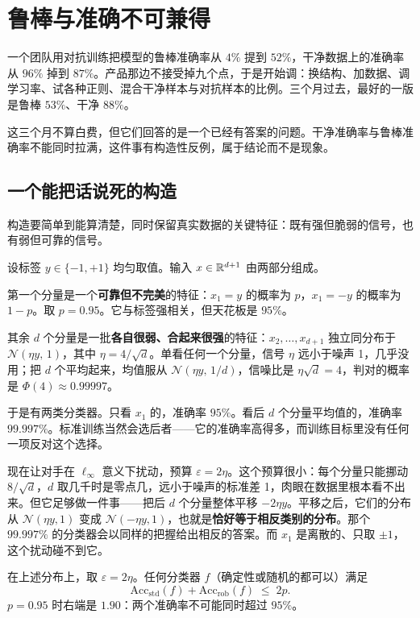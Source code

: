 \section{鲁棒与准确不可兼得}
\label{sec:17-Constrained-Guarantees/02-Adversarial-Robustness/03}

一个团队用对抗训练把模型的鲁棒准确率从 \(4\%\) 提到 \(52\%\)，干净数据上的准确率从 \(96\%\) 掉到 \(87\%\)。产品那边不接受掉九个点，于是开始调：换结构、加数据、调学习率、试各种正则、混合干净样本与对抗样本的比例。三个月过去，最好的一版是鲁棒 \(53\%\)、干净 \(88\%\)。

这三个月不算白费，但它们回答的是一个已经有答案的问题。干净准确率与鲁棒准确率不能同时拉满，这件事有构造性反例，属于结论而不是现象。

\subsection{一个能把话说死的构造}

构造要简单到能算清楚，同时保留真实数据的关键特征：既有强但脆弱的信号，也有弱但可靠的信号。

设标签 \(y\in\{-1,+1\}\) 均匀取值。输入 \(x\in\mathbb{R}^{d+1}\) 由两部分组成。

第一个分量是一个\textbf{可靠但不完美}的特征：\(x_1=y\) 的概率为 \(p\)，\(x_1=-y\) 的概率为 \(1-p\)。取 \(p=0.95\)。它与标签强相关，但天花板是 \(95\%\)。

其余 \(d\) 个分量是一批\textbf{各自很弱、合起来很强}的特征：\(x_2,\dots,x_{d+1}\) 独立同分布于 \(\mathcal N(\eta y,\,1)\)，其中 \(\eta=4/\sqrt d\)。单看任何一个分量，信号 \(\eta\) 远小于噪声 1，几乎没用；把 \(d\) 个平均起来，均值服从 \(\mathcal N(\eta y,\,1/d)\)，信噪比是 \(\eta\sqrt d=4\)，判对的概率是 \(\Phi(4)\approx0.99997\)。

于是有两类分类器。只看 \(x_1\) 的，准确率 \(95\%\)。看后 \(d\) 个分量平均值的，准确率 \(99.997\%\)。标准训练当然会选后者——它的准确率高得多，而训练目标里没有任何一项反对这个选择。

现在让对手在 \(\ell_\infty\) 意义下扰动，预算 \(\varepsilon=2\eta\)。这个预算很小：每个分量只能挪动 \(8/\sqrt d\)，\(d\) 取几千时是零点几，远小于噪声的标准差 1，肉眼在数据里根本看不出来。但它足够做一件事——把后 \(d\) 个分量整体平移 \(-2\eta y\)。平移之后，它们的分布从 \(\mathcal N(\eta y,1)\) 变成 \(\mathcal N(-\eta y,1)\)，也就是\textbf{恰好等于相反类别的分布}。那个 \(99.997\%\) 的分类器会以同样的把握给出相反的答案。而 \(x_1\) 是离散的、只取 \(\pm1\)，这个扰动碰不到它。

\begin{theorem}[标准与鲁棒的和被卡住]
在上述分布上，取 \(\varepsilon=2\eta\)。任何分类器 \(f\)（确定性或随机的都可以）满足
\[
\mathrm{Acc}_{\mathrm{std}}(f)+\mathrm{Acc}_{\mathrm{rob}}(f)\;\le\;2p .
\]
\(p=0.95\) 时右端是 \(1.90\)：两个准确率不可能同时超过 \(95\%\)。
\end{theorem}

